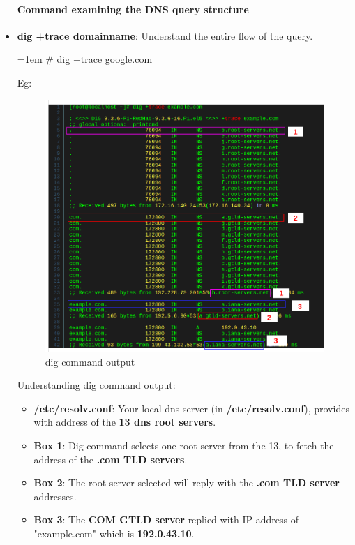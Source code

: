 \begin{flushleft}
\begin{itemize}
\begin{itemize}
		\end{itemize}
	
		\newpage
		
		\paragraph{Command examining the DNS query structure}
		\bigskip
		\item \textbf{dig +trace domainname}: Understand the entire flow of the query.
		\bigskip
		\begin{tcolorbox}[breakable,notitle,boxrule=-0pt,colback=black,colframe=black]
			\color{green}
			\font=1em
			\# dig +trace google.com
			\font=4pt
		\end{tcolorbox}
		Eg:
		\begin{figure}[h!]
			\centering
			\includegraphics[scale=.35]{content/chapter3/images/dig.png}
			\caption{dig command output}
			\label{fig:dig}
		\end{figure}
		
		Understanding dig command output:
		\begin{itemize}
			\item \textbf{/etc/resolv.conf}: Your local dns server (in \textbf{/etc/resolv.conf}), provides with address of the \textbf{13 dns root servers}. 
			\item \textbf{Box 1}: Dig command selects one root server from the 13, to fetch the address of the \textbf{.com TLD servers}. 
			\item \textbf{Box 2}: The root server selected will reply with the \textbf{.com TLD server} addresses.
			\item \textbf{Box 3}: The \textbf{COM GTLD server} replied with IP address of "example.com" which is \textbf{192.0.43.10}.
			
			
		\end{itemize}
		
		
		

	\end{itemize}	
	
\end{flushleft}

\newpage
